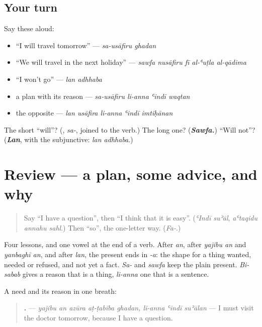 \subsection*{Your turn}
Say these aloud:

\begin{itemize}
\raggedright
  \item \textquotedblleft{}I will travel tomorrow\textquotedblright{} — \emph{sa-usāfiru ghadan}
  \item \textquotedblleft{}We will travel in the next holiday\textquotedblright{} — \emph{sawfa nusāfiru fī al-ʿuṭla al-qādima}
  \item \textquotedblleft{}I won't go\textquotedblright{} — \emph{lan adhhaba}
  \item a plan with its reason — \emph{sa-usāfiru li-anna ʿindī waqtan}
  \item the opposite — \emph{lan usāfira li-anna ʿindī imtiḥānan}
\end{itemize}

\begin{tcolorbox}[breakable,colback=teal!4,colframe=teal!35!black,title={Before you move on}]
The short \textquotedblleft{}will\textquotedblright{}? (\textbf{}, \emph{sa-}, joined to the verb.) The long one? (\emph{\textbf{Sawfa.}}) \textquotedblleft{}Will not\textquotedblright{}? (\emph{\textbf{Lan}}, with the subjunctive: \emph{lan adhhaba}.)
\end{tcolorbox}
\section[(review)]{Review — a plan, some advice, and why}

\label{lesson:AR-R286-advice-and-reasons}



\begin{quote}
Say \textquotedblleft{}I have a question\textquotedblright{}, then \textquotedblleft{}I think that it is easy\textquotedblright{}. (\emph{ʿIndī suʾāl}, \emph{aʿtaqidu annahu sahl}.) Then \textquotedblleft{}so\textquotedblright{}, the one-letter way. (\emph{Fa-}.)
\end{quote}

\begin{grammarlens}[title={What you've built}]
Four lessons, and one vowel at the end of a verb. After \emph{an}, after \emph{yajibu an} and \emph{yanbaghī an}, and after \emph{lan}, the present ends in \emph{-a}: the shape for a thing wanted, needed or refused, and not yet a fact. \emph{Sa-} and \emph{sawfa} keep the plain present. \emph{Bi-sabab} gives a reason that is a thing, \emph{li-anna} one that is a sentence.

A need and its reason in one breath:

\begin{quote}
\textbf{       .} — \emph{yajibu an azūra aṭ-ṭabība ghadan, li-anna ʿindī suʾālan} — I must visit the doctor tomorrow, because I have a question.
\end{quote}
\end{grammarlens}

